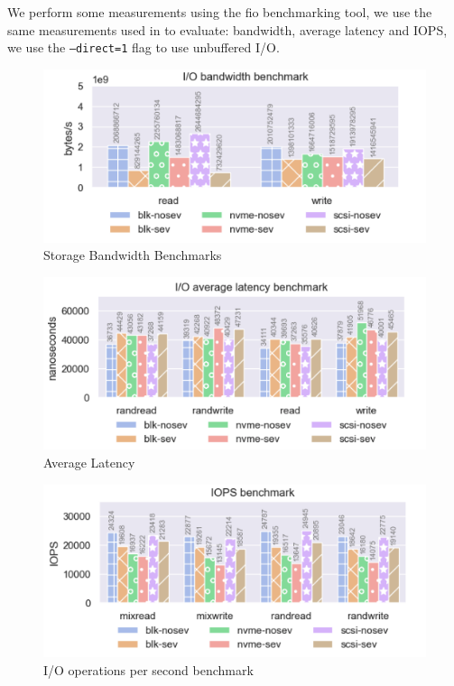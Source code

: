 \documentclass[twocolumn]{article}
\begin{document}
    We perform some measurements using the fio \cite{fio} benchmarking tool, we use the same measurements used in \cite{spool} to evaluate: bandwidth, average latency and IOPS, we use the \texttt{--direct=1} flag to use unbuffered I/O.

    \begin{figure}
        \centering
        \includegraphics[width=\columnwidth]{img/bw.png}
        \caption{Storage Bandwidth Benchmarks}
    \end{figure}

    \begin{figure}
        \centering
        \includegraphics[width=\columnwidth]{img/al.png}
        \caption{Average Latency}
    \end{figure}

    \begin{figure}
        \centering
        \includegraphics[width=\columnwidth]{img/iops.png}
        \caption{I/O operations per second benchmark}
    \end{figure}
\end{document}
